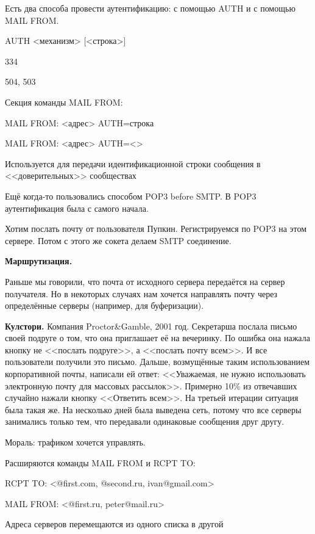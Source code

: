 Есть два способа провести аутентификацию: с помощью AUTH и с помощью MAIL FROM.

AUTH <механизм> [<строка>]
\begin{MyItemize}
    \item 334
    \item 504, 503
\end{MyItemize}

Секция команды MAIL FROM:
\begin{MyItemize}
    \item MAIL FROM: <адрес> AUTH=строка
    \item MAIL FROM: <адрес> AUTH=<>
    \item Используется для передачи идентификационной строки сообщения в <<доверительных>> сообществах
\end{MyItemize}

Ещё когда-то пользовались способом POP3 before SMTP. В POP3 аутентификация была с самого начала.

Хотим послать почту от пользователя Пупкин. Регистрируемся по POP3 на этом сервере. Потом с этого же сокета делаем SMTP соединение.

{\bf Маршрутизация.}

Раньше мы говорили, что почта от исходного сервера передаётся на сервер получателя. Но в некоторых случаях нам хочется направлять почту через определённые серверы (например, для буферизации).

{\bf Кулстори.} Компания Proctor\&Gamble, 2001 год. Секретарша послала письмо своей подруге о том, что она приглашает её на вечеринку. По ошибка она нажала кнопку не <<послать подруге>>, а <<послать почту всем>>. И все пользователи получили это письмо. Дальше, возмущённые таким использованием корпоративной почты, написали ей ответ: <<Уважаемая, не нужно использовать электронную почту для массовых рассылок>>. Примерно 10\% из отвечавших случайно нажали кнопку <<Ответить всем>>. На третьей итерации ситуация была такая же. На несколько дней была выведена сеть, потому что все серверы занимались только тем, что передавали одинаковые сообщения друг другу.

Мораль: трафиком хочется управлять. 

Расширяются команды MAIL FROM и RCPT TO:
\begin{MyItemize}
    \item RCPT TO: <@first.com, @second.ru, ivan@gmail.com>
    \item MAIL FROM: <@first.ru, peter@mail.ru>
    \item Адреса серверов перемещаются из одного списка в другой
\end{MyItemize}

